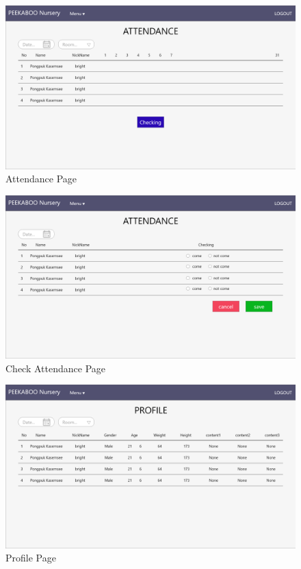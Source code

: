 \begin{figure}
  \begin{center}
  \includegraphics[width=\linewidth]{images/AttendancePage.png}
  \end{center}
  \caption[Poem]{Attendance Page}
  \label{fig:Attendance}
  \end{figure}

\begin{figure}
  \begin{center}
  \includegraphics[width=\linewidth]{images/AttendancePageChecking.png}
  \end{center}
  \caption[Poem]{Check Attendance Page}
  \label{fig:CheckAttendance}
  \end{figure}

\begin{figure}
  \begin{center}
  \includegraphics[width=\linewidth]{images/ProfileOnePage.png}
  \end{center}
  \caption[Poem]{Profile Page}
  \label{fig:Profile}
  \end{figure}

